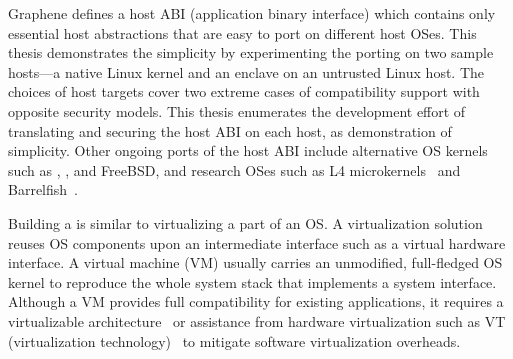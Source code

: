Graphene defines a host ABI (application binary interface)
which contains
only essential host abstractions
that are easy to port on different host OSes. 
This thesis demonstrates the simplicity
by experimenting the porting
on two sample hosts---a native Linux kernel and an \sgx{} enclave on an untrusted Linux host.
The choices of host targets
cover two extreme cases of compatibility support with opposite security models.
This thesis enumerates the development effort of translating
and securing the host ABI on each host,
as demonstration of simplicity.
Other ongoing ports of the host ABI
include alternative OS kernels such as \win{}, \osx{}, and FreeBSD, and research OSes such as L4 microkernels~\cite{l4family} and Barrelfish~\cite{baumann09barrelfish}.


Building a \libos{} is similar to virtualizing 
a part of an OS.%
A virtualization solution reuses OS components upon
an intermediate interface
such as a virtual hardware interface.
A virtual machine (VM) usually carries an unmodified, full-fledged OS kernel
to reproduce the whole system stack that
implements a system interface. 
Although a VM provides full compatibility for existing applications,
it requires a virtualizable architecture~\cite{popek74virtual}
or assistance from
hardware virtualization such as VT (virtualization technology)~\cite{VT}
to mitigate software virtualization overheads.


